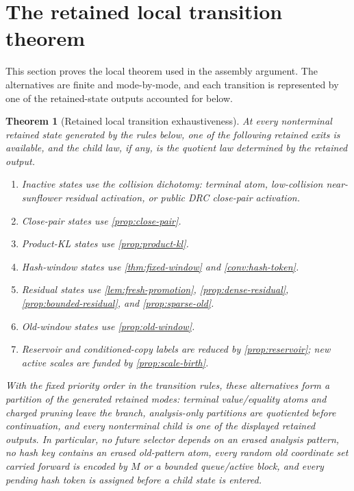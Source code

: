 \documentclass[11pt]{article}
\newcommand{\Cref}[1]{\ref{#1}}
\newtheorem{theorem}{Theorem}[section]
\theoremstyle{remark}
\begin{document}
\section{The retained local transition theorem}\label{sec:local-transition}

This section proves the local theorem used in the assembly argument.  The alternatives are finite and mode-by-mode, and each transition is represented by one of the retained-state outputs accounted for below.

\begin{theorem}[Retained local transition exhaustiveness]\label{thm:local-transition}
At every nonterminal retained state generated by the rules below, one of the following retained exits is available, and the child law, if any, is the quotient law determined by the retained output.
\begin{enumerate}[label=\textup{(\roman*)}]
\item Inactive states use the collision dichotomy: terminal atom, low-collision near-sunflower residual activation, or public DRC close-pair activation.
\item Close-pair states use \Cref{prop:close-pair}.
\item Product-KL states use \Cref{prop:product-kl}.
\item Hash-window states use \Cref{thm:fixed-window} and \Cref{conv:hash-token}.
\item Residual states use \Cref{lem:fresh-promotion}, \Cref{prop:dense-residual}, \Cref{prop:bounded-residual}, and \Cref{prop:sparse-old}.
\item Old-window states use \Cref{prop:old-window}.
\item Reservoir and conditioned-copy labels are reduced by \Cref{prop:reservoir}; new active scales are funded by \Cref{prop:scale-birth}.
\end{enumerate}
With the fixed priority order in the transition rules, these alternatives form a partition of the generated retained modes: terminal value/equality atoms and charged pruning leave the branch, analysis-only partitions are quotiented before continuation, and every nonterminal child is one of the displayed retained outputs.  In particular, no future selector depends on an erased analysis pattern, no hash key contains an erased old-pattern atom, every random old coordinate set carried forward is encoded by $M$ or a bounded queue/active block, and every pending hash token is assigned before a child state is entered.
\end{theorem}
\end{document}
